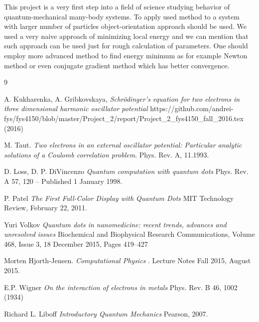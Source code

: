 \documentclass[10pt]{article}
\begin{document}
This project is a very first step into a field of science studying behavior of quantum-mechanical many-body systems. To apply used method to a system with larger number of particles object-orientation approach should be used. We used a very naive approach of minimizing local energy and we can mention that such approach can be used just for rough calculation of parameters. One should employ more advanced method to find energy minimum as for example Newton method or even conjugate gradient method which has better convergence. 
\newpage

\begin{thebibliography} {9}

A. Kukharenka, A. Gribkovskaya,
\textit
{Schr\"{o}dinger's equation for two electrons in three dimensional harmonic oscillator potential
}
https://github.com/andrei-fys/fys4150/blob/master/Project\_2/report/Project\_2\_fys4150\_fall\_2016.tex (2016)


M. Taut. 
\textit{Two electrons in an external oscillator potential: Particular analytic solutions of a Coulomb correlation problem}.
Phys. Rev. A, 11.1993.


D. Loss, D. P. DiVincenzo
\textit{
Quantum computation with quantum dots
}
Phys. Rev. A 57, 120 – Published 1 January 1998.

P. Patel
\textit
{The First Full-Color Display with Quantum Dots
}
MIT Technology Review, February 22, 2011.

Yuri Volkov
\textit
{Quantum dots in nanomedicine: recent trends, advances and unresolved issues
}
Biochemical and Biophysical Research Communications, Volume 468, Issue 3, 18 December 2015, Pages 419–427

Morten Hjorth-Jensen. 
\textit{Computational Physics
}. 
Lecture Notes Fall 2015, August 2015.


E.P. Wigner
\textit
{On the interaction of electrons in metals
}
Phys. Rev. B 46, 1002 (1934) 

Richard L. Liboff
\textit
{Introductory Quantum Mechanics
}
Pearson, 2007.


\end{thebibliography}
\end{document}
